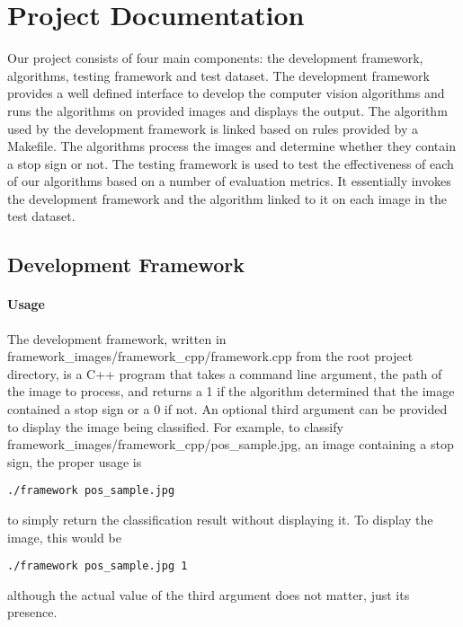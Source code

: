 \documentclass[letterpaper,10pt,titlepage]{article}
\begin{document}
\section*{Project Documentation}
Our project consists of four main components: the development framework, 
algorithms, testing framework and test dataset. The development framework
provides a well defined interface to develop the computer vision algorithms and
runs the algorithms on provided images and displays the output. The algorithm 
used by the development framework is linked based on rules provided by a 
Makefile. The algorithms process the images and determine whether they contain
a stop sign or not. The testing framework is used to test the effectiveness of
each of our algorithms based on a number of evaluation metrics. It essentially
invokes the development framework and the algorithm linked to it on each image
in the test dataset.

\subsection*{Development Framework}
\paragraph*{Usage}
The development framework, written in
framework\_images/framework\_cpp/framework.cpp from the root project directory,
is a C++ program that takes a command line argument, the path of the image to
process, and returns a 1 if the algorithm determined that the image contained a
stop sign or a 0 if not. An optional third argument can be provided to display
the image being classified. For example, to classify 
framework\_images/framework\_cpp/pos\_sample.jpg, an image containing a stop
sign, the proper usage is
\begin{lstlisting}
./framework pos_sample.jpg
\end{lstlisting}
to simply return the classification result without displaying it. To display
the image, this would be
\begin{lstlisting}
./framework pos_sample.jpg 1
\end{lstlisting}
although the actual value of the third argument does not matter, just its 
presence.
\end{document}
